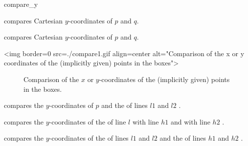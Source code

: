 \begin{ccRefFunction}{compare_y}

	{compares Cartesian $y$-coordinates of $p$ and $q$.}

	{compares Cartesian $y$-coordinates of $p$ and $q$.}

\begin{ccHtmlOnly}
<img border=0 src=./compare1.gif align=center alt="Comparison of the x 
or y coordinates of the (implicitly given) points in the boxes">
\end{ccHtmlOnly} 

\begin{ccTexOnly}
\begin{figure}[hb]
\centerline{}
\caption{Comparison of the $x$ or $y$-coordinates of the (implicitly
given) points in the boxes.\label{fig-compare13}}
\end{figure} 
\end{ccTexOnly} 

        {compares the $y$-coordinates of $p$ and the  of lines
         $l1$ and $l2$%
         .}


        {compares the $y$-coordinates of the  of line $l$
         with line $h1$ and with line $h2$%
         .}


        {compares the $y$-coordinates of the  of lines $l1$
         and $l2$ and  the  of lines $h1$ and $h2$ 
         .}

\end{ccRefFunction}

